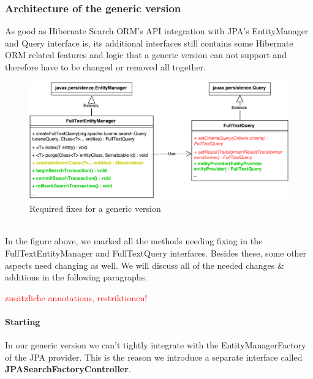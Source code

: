 \pagebreak

\subsubsection{Architecture of the generic version}

As good as Hibernate Search ORM's API integration with JPA's EntityManager and Query interface is, its additional interfaces still contains some Hibernate ORM related features and logic that a generic version can not support and therefore have to be changed or removed all together.
\\
\begin{figure}[ht]
	\centering
	\includegraphics[scale=0.6]{images/hibernate_search_jpa_integration_with_differences.pdf}
	\caption{Required fixes for a generic version}
	\label{hibernate_search_jpa_integration_with_differences}
\end{figure}
\\
In the figure above, we marked all the methods needing fixing in the FullTextEntityManager and FullTextQuery interfaces. Besides these, some other aspects need changing as well. We will discuss all of the needed changes \& additions in the following paragraphs.

\textcolor{red}{zusätzliche annotations, restriktionen!}

\paragraph{Starting}

In our generic version we can't tightly integrate with the EntityManagerFactory of the JPA provider. This is the reason we introduce a separate interface called \textbf{JPASearchFactoryController}.

